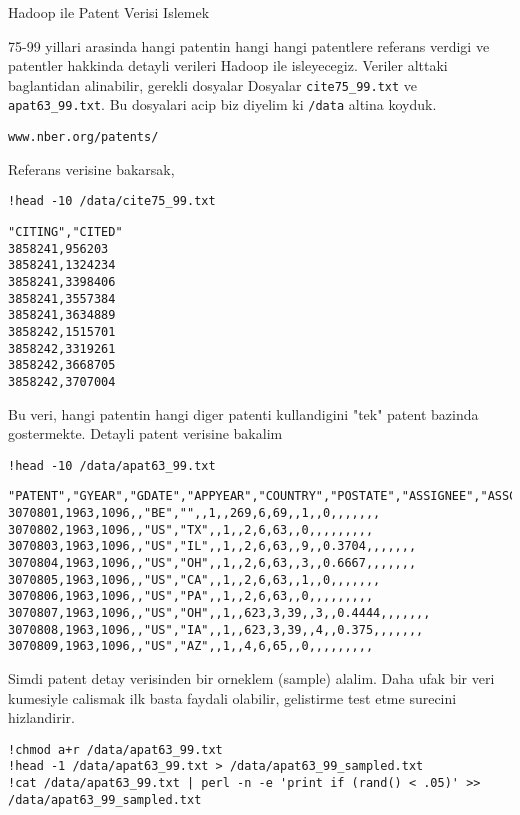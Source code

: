 \documentclass[12pt,fleqn]{article}\usepackage{../common}
\begin{document}
Hadoop ile Patent Verisi Islemek

75-99 yillari arasinda hangi patentin hangi hangi patentlere referans
verdigi ve patentler hakkinda detayli verileri Hadoop ile
isleyecegiz. Veriler alttaki baglantidan alinabilir, gerekli dosyalar
Dosyalar \verb!cite75_99.txt! ve \verb!apat63_99.txt!. Bu dosyalari
acip biz diyelim ki \verb!/data! altina koyduk. 

\verb!www.nber.org/patents/!

Referans verisine bakarsak,

\begin{verbatim}
!head -10 /data/cite75_99.txt
\end{verbatim}

\begin{verbatim}
"CITING","CITED"
3858241,956203
3858241,1324234
3858241,3398406
3858241,3557384
3858241,3634889
3858242,1515701
3858242,3319261
3858242,3668705
3858242,3707004
\end{verbatim}

Bu veri, hangi patentin hangi diger patenti kullandigini "tek" patent
bazinda gostermekte. Detayli patent verisine bakalim

\begin{verbatim}
!head -10 /data/apat63_99.txt
\end{verbatim}

\begin{verbatim}
"PATENT","GYEAR","GDATE","APPYEAR","COUNTRY","POSTATE","ASSIGNEE","ASSCODE","CLAIMS","NCLASS","CAT","SUBCAT","CMADE","CRECEIVE","RATIOCIT","GENERAL","ORIGINAL","FWDAPLAG","BCKGTLAG","SELFCTUB","SELFCTLB","SECDUPBD","SECDLWBD"
3070801,1963,1096,,"BE","",,1,,269,6,69,,1,,0,,,,,,,
3070802,1963,1096,,"US","TX",,1,,2,6,63,,0,,,,,,,,,
3070803,1963,1096,,"US","IL",,1,,2,6,63,,9,,0.3704,,,,,,,
3070804,1963,1096,,"US","OH",,1,,2,6,63,,3,,0.6667,,,,,,,
3070805,1963,1096,,"US","CA",,1,,2,6,63,,1,,0,,,,,,,
3070806,1963,1096,,"US","PA",,1,,2,6,63,,0,,,,,,,,,
3070807,1963,1096,,"US","OH",,1,,623,3,39,,3,,0.4444,,,,,,,
3070808,1963,1096,,"US","IA",,1,,623,3,39,,4,,0.375,,,,,,,
3070809,1963,1096,,"US","AZ",,1,,4,6,65,,0,,,,,,,,,
\end{verbatim}

Simdi patent detay verisinden bir orneklem (sample) alalim. Daha ufak bir
veri kumesiyle calismak ilk basta faydali olabilir, gelistirme test etme
surecini hizlandirir.

\begin{verbatim}
!chmod a+r /data/apat63_99.txt
!head -1 /data/apat63_99.txt > /data/apat63_99_sampled.txt
!cat /data/apat63_99.txt | perl -n -e 'print if (rand() < .05)' >> /data/apat63_99_sampled.txt
\end{verbatim}
\end{document}

